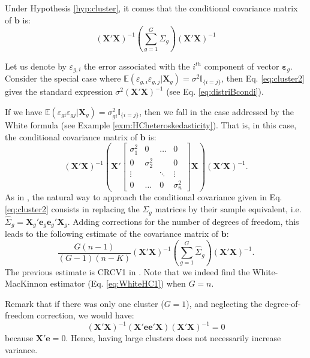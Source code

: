 \documentclass[
  11pt,
]{book}
\theoremstyle{definition}
\theoremstyle{definition}
\theoremstyle{definition}
\theoremstyle{definition}
\theoremstyle{remark}
\begin{document}
Under Hypothesis \ref{hyp:cluster}, it comes that the conditional covariance matrix of \(\mathbf{b}\) is:
\begin{equation}
\left(\mathbf{X}'\mathbf{X}\right)^{-1}\left(\sum_{g=1}^G \Sigma_g\right)\left(\mathbf{X}'\mathbf{X}\right)^{-1}\label{eq:cluster2}
\end{equation}

Let us denote by \(\varepsilon_{g,i}\) the error associated with the \(i^{th}\) component of vector \(\boldsymbol\varepsilon_g\). Consider the special case where \(\mathbb{E}(\varepsilon_{g,i} \varepsilon_{g,j}|\mathbf{X}_g)=\sigma^2\mathbb{I}_{\{i=j\}}\), then Eq. \eqref{eq:cluster2} gives the standard expression \(\sigma^2\left(\mathbf{X}'\mathbf{X}\right)^{-1}\) (see Eq. \eqref{eq:distriBcondi}).

If we have \(\mathbb{E}(\varepsilon_{gi} \varepsilon_{gj}|\mathbf{X}_g)=\sigma_{gi}^2\mathbb{I}_{\{i=j\}}\), then we fall in the case addressed by the White formula (see Example \ref{exm:HCheteroskedasticity}). That is, in this case, the conditional covariance matrix of \(\mathbf{b}\) is:
\[
\left(\mathbf{X}'\mathbf{X}\right)^{-1}\left(\mathbf{X}'\left[  \begin{array}{cccc}
\sigma_1^2 & 0 & \dots & 0 \\
0 & \sigma_2^2 &  & 0 \\
\vdots && \ddots& \vdots \\
0 & \dots & 0 & \sigma_n^2
\end{array} \right]\mathbf{X}\right)\left(\mathbf{X}'\mathbf{X}\right)^{-1}.
\]
As in \citet{White_1980}, the natural way to approach the conditional covariance given in Eq. \eqref{eq:cluster2} consists in replacing the \(\Sigma_g\) matrices by their sample equivalent, i.e.~\(\widehat{\Sigma}_g=\mathbf{X}_g'\mathbf{e}_g\mathbf{e}_g'\mathbf{X}_g\). Adding corrections for the number of degrees of freedom, this leads to the following estimate of the covariance matrix of \(\mathbf{b}\):
\begin{equation}
\frac{G(n-1)}{(G-1)(n-K)}\left(\mathbf{X}'\mathbf{X}\right)^{-1}\left(\sum_{g=1}^G\widehat{\Sigma}_g\right) \left(\mathbf{X}'\mathbf{X}\right)^{-1}. \label{eq:AsymptCL}
\end{equation}
The previous estimate is CRCV1 in \citet{MACKINNON2022}. Note that we indeed find the White-MacKinnon estimator (Eq. \eqref{eq:WhiteHC1}) when \(G=n\).

Remark that if there was only one cluster (\(G=1\)), and neglecting the degree-of-freedom correction, we would have:
\[
\left(\mathbf{X}'\mathbf{X}\right)^{-1}\left(\mathbf{X}'\mathbf{e}\mathbf{e}'\mathbf{X}\right) \left(\mathbf{X}'\mathbf{X}\right)^{-1} = 0
\]
because \(\mathbf{X}'\mathbf{e}=0\). Hence, having large clusters does not necessarily increase variance.
\end{document}
